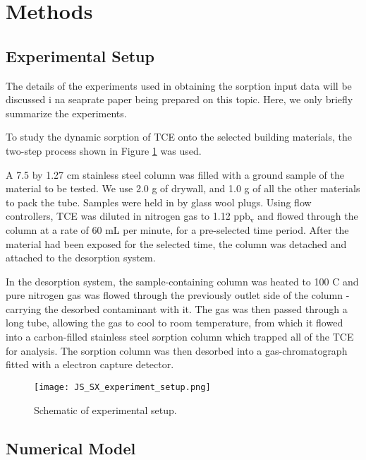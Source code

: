 \section{Methods}\label{sec:methods}

\subsection{Experimental Setup}\label{sec:experimental_method}

The details of the experiments used in obtaining the sorption input data will be discussed i na seaprate paper being prepared on this topic.
Here, we only briefly summarize the experiments.

To study the dynamic sorption of TCE onto the selected building materials, the two-step process shown in Figure \ref{fig:js_sx_setup} was used.\par

A 7.5 by 1.27 cm stainless steel column was filled with a ground sample of the material to be tested.
We use 2.0 g of drywall, and 1.0 g of all the other materials to pack the tube.
Samples were held in by glass wool plugs.
Using flow controllers, TCE was diluted in nitrogen gas to 1.12 $\mathrm{ppb_v}$ and flowed through the column at a rate of 60 mL per minute, for a pre-selected time period.
After the material had been exposed for the selected time, the column was detached and attached to the desorption system.\par

In the desorption system, the sample-containing column was heated to 100 \degree C and pure nitrogen gas was flowed through the previously outlet side of the column - carrying the desorbed contaminant with it.
The gas was then passed through a long tube, allowing the gas to cool to room temperature, from which it flowed into a carbon-filled stainless steel sorption column which trapped all of the TCE for analysis.
The sorption column was then desorbed into a gas-chromatograph fitted with a electron capture detector.\par

\begin{figure}
  \texttt{[image: JS\_SX\_experiment\_setup.png]}
  \caption{Schematic of experimental setup.}
  \label{fig:js_sx_setup}
\end{figure}

\subsection{Numerical Model}\label{sec:model}

